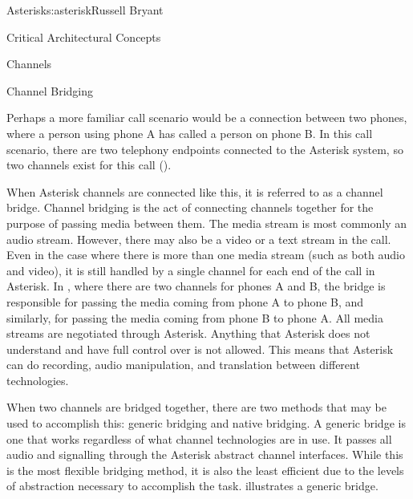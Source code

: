 \begin{aosachapter}{Asterisk}{s:asterisk}{Russell Bryant}
\begin{aosasect1}{Critical Architectural Concepts}
\begin{aosasect2}{Channels}

\end{aosasect2}

\begin{aosasect2}{Channel Bridging}

Perhaps a more familiar call scenario would be a connection between
two phones, where a person using phone A has called a person on phone
B\@. In this call scenario, there are two telephony endpoints connected
to the Asterisk system, so two channels exist for this call
().


When Asterisk channels are connected like this, it is referred to as a
channel bridge. Channel bridging is the act of connecting channels
together for the purpose of passing media between them. The media
stream is most commonly an audio stream. However, there may also be a
video or a text stream in the call. Even in the case where there is
more than one media stream (such as both audio and video), it is still
handled by a single channel for each end of the call in Asterisk. In
, where there are two channels
for phones A and B, the bridge is responsible for passing the media
coming from phone A to phone B, and similarly, for passing the media
coming from phone B to phone A\@. All media streams are negotiated
through Asterisk. Anything that Asterisk does not understand
and have full control over is not allowed. This means that Asterisk 
can do recording,
audio manipulation, and translation between different technologies.

When two channels are bridged together, there are two methods that may
be used to accomplish this: generic bridging and native bridging.
A generic bridge is one that works regardless of what
channel technologies are in use. It passes all audio and signalling
through the Asterisk abstract channel interfaces. While this is the
most flexible bridging method, it is also the least efficient due to
the levels of abstraction necessary to accomplish the task.
 illustrates a generic bridge.


\end{aosasect2}
\end{aosasect1}
\end{aosachapter}
